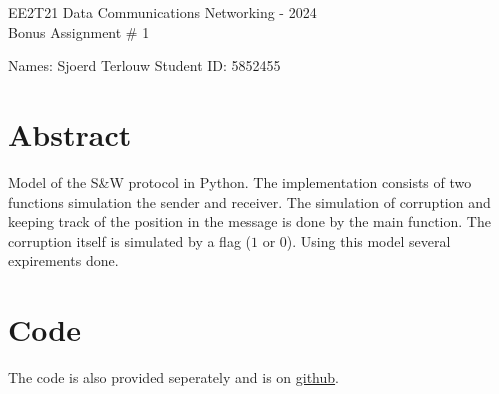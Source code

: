 \documentclass[11pt,fleqn]{article}
\begin{document}
	\begin{center}
		{\Large EE2T21 Data Communications Networking - 2024\\[0.1em]
			Bonus Assignment \# 1 \\}
	\end{center}

    \parbox[l][17mm][t]{\textwidth}{Names: Sjoerd Terlouw \hspace{6.66cm}
			Student ID: 5852455}
	\section{Abstract}
    Model of the S\&W protocol in Python. The implementation consists of two functions simulation the sender and receiver. The simulation of corruption and keeping track of the position in the message is done by the main function. The corruption itself is simulated by a flag ($1$ or $0$). 
    Using this model several expirements done.



    \newpage
    \section{Code}
    The code is also provided seperately and is on \href{https://github.com/SjdTl/Data-communications-networking.git}{\color{blue}github}.
    \inputminted[breaklines=true]{python3}{Stop-and-wait_protocol.py}
\end{document}
